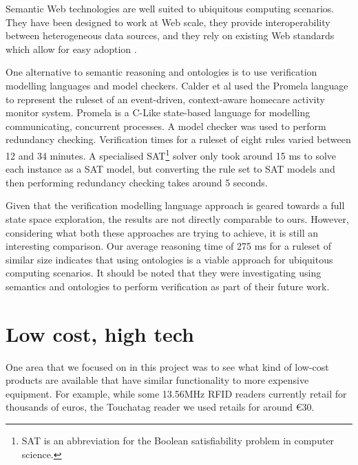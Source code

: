 Semantic Web technologies are well suited to ubiquitous computing scenarios. They have been designed to work at Web scale, they provide interoperability between heterogeneous data sources, and they rely on existing Web standards which allow for easy adoption \cite{Sabou2010}.

One alternative to semantic reasoning and ontologies is to use verification modelling languages and model checkers. Cal\-der et al \cite{Calder2009} used the Promela language to represent the ruleset of an event-driven, context-aware homecare activity monitor system. Promela is a C-Like state-based language for modelling communicating, concurrent processes. A model checker was used to perform redundancy checking. Verification times for a ruleset of eight rules varied between 12 and 34 minutes. A specialised SAT\footnote{SAT is an abbreviation for the Boolean satisfiability problem in computer science.} solver only took around 15 ms to solve each instance as a SAT model, but converting the rule set to SAT models and then performing redundancy checking takes around 5 seconds.

Given that the verification modelling language approach is geared towards a full state space exploration, the results are not directly comparable to ours. However, considering what both these approaches are trying to achieve, it is still an interesting comparison.
 Our average reasoning time of 275 ms for a ruleset of similar size indicates that using ontologies is a viable approach for ubiquitous computing scenarios. It should be noted that they were investigating using semantics and ontologies to perform verification as part of their future work.




\section{Low cost, high tech}

One area that we focused on in this project was to see what kind of low-cost products are available that have similar functionality to more expensive equipment. For example, while some 13.56MHz \ac{RFID} readers currently retail for thousands of euros, the Touchatag reader we used retails for around \euro 30.  

